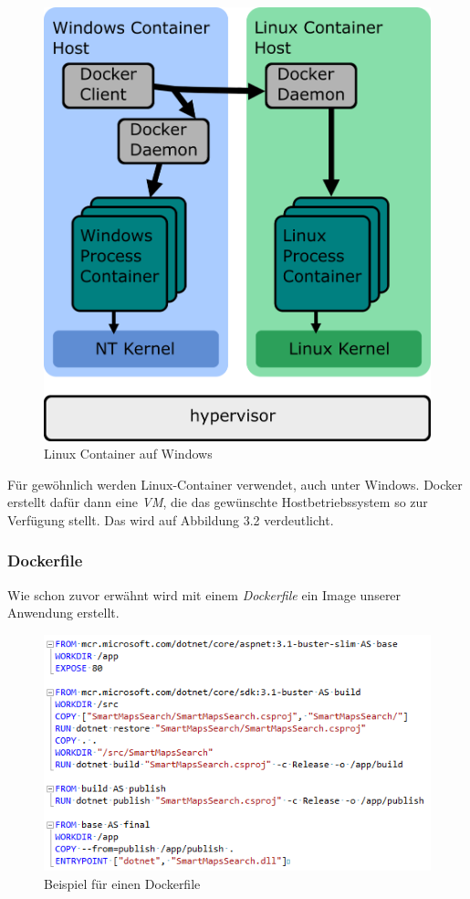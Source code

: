 \documentclass[12pt,a4paper]{scrartcl}
\begin{document}
\begin{figure}[h!]
	\centering
	\includegraphics[scale=2]{DockerWindows.png}
	\caption[https://docs.microsoft.com/de-de/virtualization/windowscontainers/deploy-containers/linux-containers]{Linux Container auf Windows}
\end{figure}

Für gewöhnlich werden Linux-Container verwendet, auch unter Windows. Docker erstellt dafür dann eine \emph{VM}, die das gewünschte Hostbetriebssystem so zur Verfügung stellt. Das wird auf Abbildung 3.2 verdeutlicht. 

\subsubsection{Dockerfile}

Wie schon zuvor erwähnt wird mit einem \emph{Dockerfile} ein Image unserer Anwendung erstellt. 

\begin{figure}[h!]
	\centering
	\includegraphics[scale=1]{DockerfileWhite.png}
	\caption[Screenshot]{Beispiel für einen Dockerfile}
\end{figure}
\end{document}
